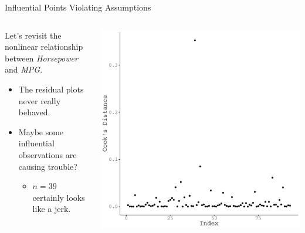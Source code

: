 \documentclass{beamer}\usepackage[]{graphicx}\usepackage[]{color}
\makeatletter
\def\maxwidth{ %
  \ifdim\Gin@nat@width>\linewidth
    \linewidth
  \else
    \Gin@nat@width
  \fi
}
\newenvironment{knitrout}{}{} %
\makeatother
\begin{document}

\begin{frame}{Influential Points Violating Assumptions}
  
  \begin{columns}
    \begin{column}{0.5\textwidth}
      
      Let's revisit the nonlinear relationship between \emph{Horsepower} and
      \emph{MPG}.  \vb
      \begin{itemize}
      \item The residual plots never really behaved.
        \vc
      \item Maybe some influential observations are causing trouble?
        \vc
        \begin{itemize}
        \item $n = 39$ certainly looks like a jerk.
        \end{itemize}
      \end{itemize}
      
    \end{column}
    
    \begin{column}{0.5\textwidth}
      
\begin{knitrout}\footnotesize
{}\color{fgcolor}

{\centering \includegraphics[width=\maxwidth]{figure/unnamed-chunk-44-1} 

}



\end{knitrout}

\end{column}
\end{columns}

\end{frame}
\end{document}
